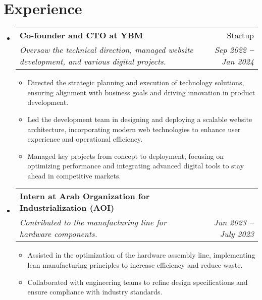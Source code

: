 \documentclass[letterpaper,10.5pt]{article}
\makeatletter
\newcommand{\resumeItem}[1]{
  \item\small{
    {#1 \vspace{-2pt}}
  }
}
\newcommand{\resumeSubheading}[4]{
  \vspace{-2pt}\item
    \begin{tabular*}{0.97\textwidth}[t]{l@{\extracolsep{\fill}}r}
      \textbf{#1} & #2 \\
      \textit{\small#3} & \textit{\small #4} \\
    \end{tabular*}\vspace{-7pt}
}
\newcommand{\resumeSubHeadingListStart}{\begin{itemize}[leftmargin=0.15in, label={}]}
\newcommand{\resumeSubHeadingListEnd}{\end{itemize}}
\newcommand{\resumeItemListStart}{\begin{itemize}}
\newcommand{\resumeItemListEnd}{\end{itemize}\vspace{-5pt}}
\makeatother
\begin{document}
\section{Experience}
  \vspace{3pt}
  \resumeSubHeadingListStart

    \resumeSubheading
      {Co-founder and CTO at YBM}{Startup}
      {Oversaw the technical direction, managed website development, and various digital projects.}{Sep 2022 \textbf{--} Jan 2024}
        \resumeItemListStart
            \resumeItem{Directed the strategic planning and execution of technology solutions, ensuring alignment with business goals and driving innovation in product development.}
            \resumeItem{Led the development team in designing and deploying a scalable website architecture, incorporating modern web technologies to enhance user experience and operational efficiency.}
            \resumeItem{Managed key projects from concept to deployment, focusing on optimizing performance and integrating advanced digital tools to stay ahead in competitive markets.}
        \resumeItemListEnd

    \resumeSubheading
      {Intern at Arab Organization for Industrialization (AOI)}{}
      {Contributed to the manufacturing line for hardware components.}{Jun 2023 \textbf{--} July 2023}
        \resumeItemListStart
            \resumeItem{Assisted in the optimization of the hardware assembly line, implementing lean manufacturing principles to increase efficiency and reduce waste.}
            \resumeItem{Collaborated with engineering teams to refine design specifications and ensure compliance with industry standards.}
        \resumeItemListEnd

  \resumeSubHeadingListEnd






\end{document}

